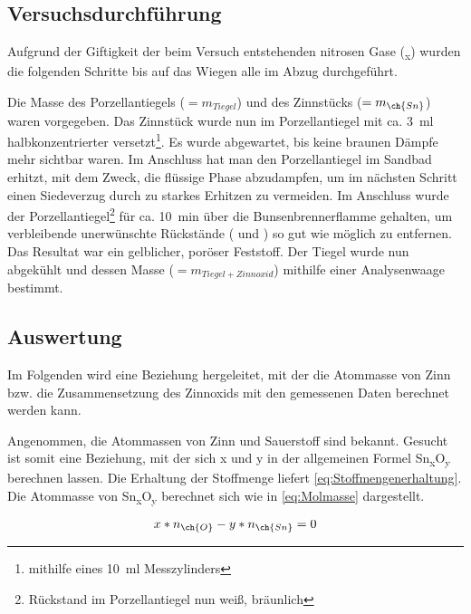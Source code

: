 \documentclass{article}
\begin{document}
    \subsection{Versuchsdurchführung} \label{sec:Versuch}
    
      Aufgrund der Giftigkeit der beim Versuch entstehenden nitrosen Gase (\textsubscript{x}) wurden die folgenden Schritte bis auf das Wiegen alle im Abzug durchgeführt. 
      
      Die Masse des Porzellantiegels ($=m_{Tiegel}$) und des Zinnstücks ($=m_{\ch{Sn}}$) waren vorgegeben. Das Zinnstück wurde nun im Porzellantiegel mit ca. \SI[mode=text]{3}{\milli\litre} halbkonzentrierter  versetzt\footnote{mithilfe eines \SI[mode=text]{10}{\milli\litre} Messzylinders}. Es wurde abgewartet, bis keine braunen Dämpfe mehr sichtbar waren. Im Anschluss hat man den Porzellantiegel im Sandbad erhitzt, mit dem Zweck, die flüssige Phase abzudampfen, um im nächsten Schritt einen Siedeverzug durch zu starkes Erhitzen zu vermeiden. Im Anschluss wurde der Porzellantiegel\footnote{Rückstand im Porzellantiegel nun weiß, bräunlich} für ca. \SI[mode=text]{10}{\minute} über die Bunsenbrennerflamme gehalten, um verbleibende unerwünschte Rückstände ( und ) so gut wie möglich zu entfernen. Das Resultat war ein gelblicher, poröser Feststoff. Der Tiegel wurde nun abgekühlt und dessen Masse ($= m_{Tiegel+Zinnoxid}$) mithilfe einer Analysenwaage bestimmt.
     
    \subsection{Auswertung}
      
      Im Folgenden wird eine Beziehung hergeleitet, mit der die Atommasse von Zinn bzw. die Zusammensetzung des Zinnoxids mit den gemessenen Daten berechnet werden kann. 
      
      Angenommen, die Atommassen von Zinn und Sauerstoff sind bekannt. Gesucht ist somit eine Beziehung, mit der sich x und y in der allgemeinen Formel Sn\textsubscript{x}O\textsubscript{y} berechnen lassen. Die Erhaltung der Stoffmenge liefert \eqref{eq:Stoffmengenerhaltung}. Die Atommasse von Sn\textsubscript{x}O\textsubscript{y} berechnet sich wie in \eqref{eq:Molmasse} dargestellt.
    
      \begin{equation}
        x * n_{\ch{O}} - y * n_{\ch{Sn}} = 0 \label{eq:Stoffmengenerhaltung} 
      \end{equation}
      
\end{document}

